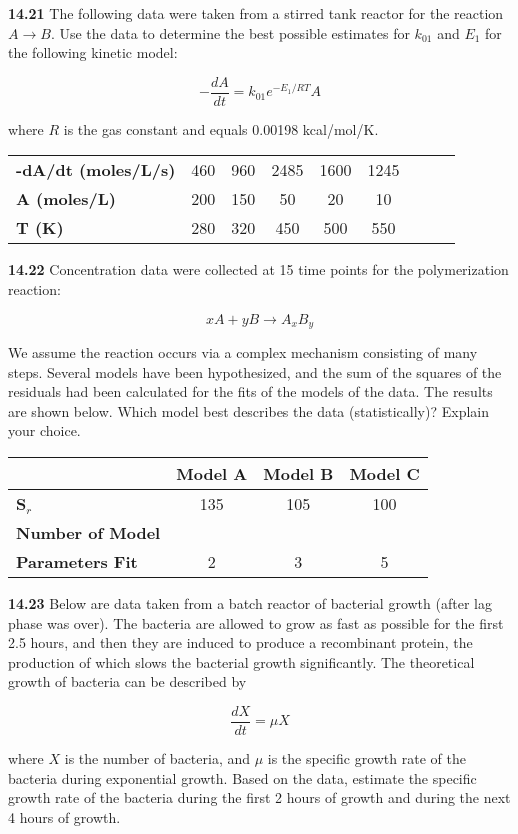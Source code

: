 \documentclass[../main.tex]{subfiles}
\begin{document}
\begin{multicols}{2}
	\noindent\textbf{14.21}  The following data were taken from a stirred tank reactor for the reaction $A \rightarrow B$. Use the data to determine the
	best possible estimates for $k_{01}$ and $E_1$ for the following
	kinetic model:

	$$- \frac{d A}{d t} = k _{01} e^{-E_1 / RT} A$$

	\noindent where $R$ is the gas constant and equals 0.00198 kcal/mol/K.

	\noindent \begin{tabular}{l c c c c c c c c}
		\textbf{-dA/dt (moles/L/s)} & 460 & 960 & 2485 & 1600 & 1245 \\ 
		\textbf{A (moles/L)} & 200 & 150 & 50 & 20 & 10 \\
		\textbf{T (K)} & 280 & 320 & 450 & 500 & 550
	\end{tabular}

	\noindent\textbf{14.22} Concentration data were collected at 15 time points
	for the polymerization reaction:

	$$x A + y B \rightarrow A_x B_y$$

	\noindent We assume the reaction occurs via a complex mechanism
	consisting of many steps. Several models have been hypothesized, and the sum of the squares of the residuals had been
	calculated for the fits of the models of the data. The results are shown below. Which model best describes the data (statistically)? Explain your choice.


	\noindent \begin{tabular}{l c c c}
		 & \textbf{Model A} & \textbf{Model B} & \textbf{Model C} \\
		\hline
		\textbf{S$_r$} & 135 & 105 & 100 \\
		\textbf{Number of Model} \\
		\textbf{Parameters Fit} & 2 & 3 & 5
  	\end{tabular}

	\noindent\textbf{14.23} Below are data taken from a batch reactor of bacterial
	growth (after lag phase was over). The bacteria are allowed
	to grow as fast as possible for the first 2.5 hours, and then
	they are induced to produce a recombinant protein, the production of which slows the bacterial growth significantly.
	The theoretical growth of bacteria can be described by

	$$\frac{d X}{dt} = \mu X$$

	\noindent where $X$ is the number of bacteria, and $\mu$ is the specific
	growth rate of the bacteria during exponential growth. Based
	on the data, estimate the specific growth rate of the bacteria
	during the first 2 hours of growth and during the next 4 hours
	of growth.


\end{multicols}
\end{document}
